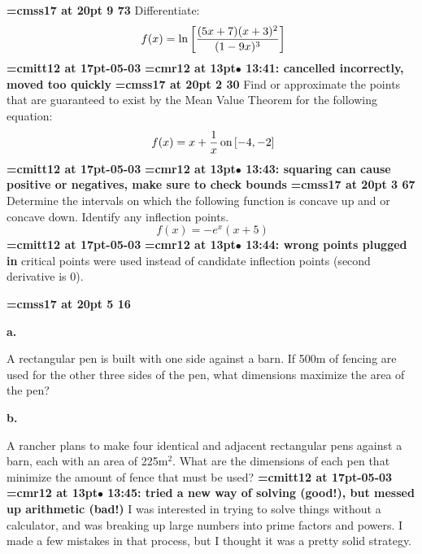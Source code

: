 {\medskip\noindent\bf\font\titlefont=cmss17 at 20pt 9 73}\medskip
Differentiate:
$$\
f(x) = \ln \bigg[{
(5x + 7)(x + 3)^2
\over
(1 - 9x)^3
}
\bigg]
$$
{\medskip\noindent\bf\font\titlefont=cmitt12 at 17pt-05-03}\medskip
{\smallskip\noindent\bf\font\titlefont=cmr12 at 13pt\titlefont $\bullet$ 13:41: cancelled incorrectly, moved too quickly}\smallskip
\xrdef{node127}
{\medskip\noindent\bf\font\titlefont=cmss17 at 20pt 2 30}\medskip
Find or approximate the points that are guaranteed to exist
by the Mean Value Theorem for the following equation:
$$\
f(x) = x + {1 \over x} \, \hbox{on} \, [-4, -2]
$$
{\medskip\noindent\bf\font\titlefont=cmitt12 at 17pt-05-03}\medskip
{\smallskip\noindent\bf\font\titlefont=cmr12 at 13pt\titlefont $\bullet$ 13:43: squaring can cause positive or negatives, make sure to check bounds}\smallskip
\xrdef{node128}
{\medskip\noindent\bf\font\titlefont=cmss17 at 20pt\titlefont 4 3 67}\medskip
Determine the intervals on which the following function is
concave up and or concave down. Identify any inflection points.
$$\
f(x) = -e^{x}(x+5)
$$
{\medskip\noindent\bf\font\titlefont=cmitt12 at 17pt-05-03}\medskip
{\smallskip\noindent\bf\font\titlefont=cmr12 at 13pt\titlefont $\bullet$ 13:44: wrong points plugged in}\smallskip
critical points were used instead of candidate inflection points (second derivative is 0).
\par

\xrdef{node129}
{\medskip\noindent\bf\font\titlefont=cmss17 at 20pt 5 16}\medskip
{\par \bf a.}
A rectangular pen is built with one side against
a barn. If 500m of fencing are used for the other three sides
of the pen, what dimensions maximize the area of the pen?
{\par \bf b.}
A rancher plans to make four identical and adjacent rectangular pens
against a barn, each with an area of 225m$^2$. What are the dimensions
of each pen that minimize the amount of fence that must be used?
{\medskip\noindent\bf\font\titlefont=cmitt12 at 17pt\titlefont 2026-05-03}\medskip
{\smallskip\noindent\bf\font\titlefont=cmr12 at 13pt\titlefont $\bullet$ 13:45: tried a new way of solving (good!), but messed up arithmetic (bad!)}\smallskip
I was interested in trying to solve things without a calculator, and was breaking up large numbers into prime factors and powers. I made a few mistakes in that process, but I thought it was a pretty solid strategy.
\par


